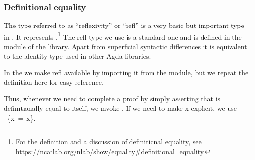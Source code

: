 \subsubsection{Definitional equality}\label{sec:defin-equal}
The type referred to as ``reflexivity'' or ``refl'' is a very basic but important
type in \mltt. It represents .\footnote{For the definition and a discussion of definitional equality, see\\\url{https://ncatlab.org/nlab/show/equality\#definitional\_equality}.}
The refl type we use is a standard one and is defined in the  module of the \typetopology library. Apart from superficial syntactic differences it is equivalent to the identity type used in other Agda libraries.

In the \ualib we make refl available by importing it from the  module, but we repeat the definition here for easy reference.
\ccpad
\begin{code}%
\>[1]\AgdaSpace{}%
\AgdaSpace{}%
\AgdaSymbol{\{}\AgdaSymbol{\}}\AgdaSpace{}%
\AgdaSymbol{\{}\AgdaSpace{}%
\AgdaSymbol{:}\AgdaSpace{}%
\AgdaSpace{}%
\AgdaSpace{}%
\AgdaSymbol{\}}\AgdaSpace{}%
\AgdaSymbol{:}\AgdaSpace{}%
\AgdaSpace{}%
\AgdaSpace{}%
\AgdaSpace{}%
\AgdaSpace{}%
\AgdaSpace{}%
\AgdaSpace{}%
\AgdaSpace{}%
\AgdaSpace{}%
\AgdaSymbol{:}\AgdaSpace{}%
\AgdaSymbol{\{}\AgdaSpace{}%
\AgdaSymbol{:}\AgdaSpace{}%
\AgdaSymbol{\}}\AgdaSpace{}%
\AgdaSpace{}%
\AgdaSpace{}%
\AgdaSpace{}%
\<%
\end{code}
\ccpad
Thus, whenever we need to complete a proof by simply asserting that is definitionally equal to itself, we invoke . If we need to make \ab x explicit, we use ~\{\ab x~=~\ab x\}.

